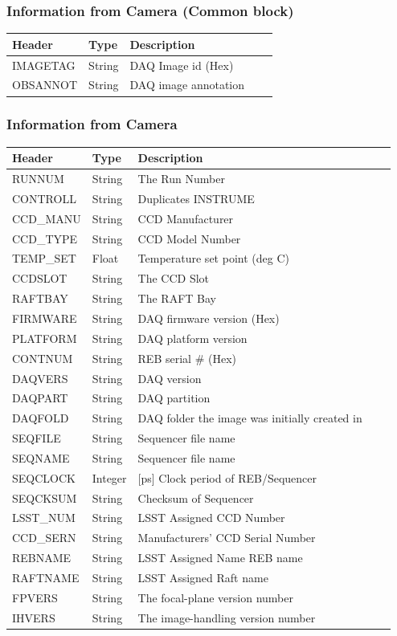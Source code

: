 \subsubsection{Information from Camera (Common block)}
\begin{tabular}{l l l l l}

\hline
Header & Type & Description \\
\hline
IMAGETAG & String & DAQ Image id (Hex) \\
OBSANNOT & String & DAQ image annotation \\
\hline
\end{tabular}


\subsubsection{Information from Camera}
\begin{tabular}{l l l l l}

\hline
Header & Type & Description \\
\hline
RUNNUM & String & The Run Number \\
CONTROLL & String & Duplicates INSTRUME \\
CCD\_MANU & String & CCD Manufacturer \\
CCD\_TYPE & String & CCD Model Number \\
TEMP\_SET & Float & Temperature set point (deg C) \\
CCDSLOT & String & The CCD Slot \\
RAFTBAY & String & The RAFT Bay \\
FIRMWARE & String & DAQ firmware version (Hex) \\
PLATFORM & String & DAQ platform version \\
CONTNUM & String & REB serial \# (Hex) \\
DAQVERS & String & DAQ version \\
DAQPART & String & DAQ partition \\
DAQFOLD & String & DAQ folder the image was initially created in \\
SEQFILE & String & Sequencer file name \\
SEQNAME & String & Sequencer file name \\
SEQCLOCK & Integer & [ps] Clock period of REB/Sequencer \\
SEQCKSUM & String & Checksum of Sequencer \\
LSST\_NUM & String & LSST Assigned CCD Number \\
CCD\_SERN & String & Manufacturers’ CCD Serial Number \\
REBNAME & String & LSST Assigned Name REB name \\
RAFTNAME & String & LSST Assigned Raft name \\
FPVERS & String & The focal-plane version number \\
IHVERS & String & The image-handling version number \\
\hline
\end{tabular}


